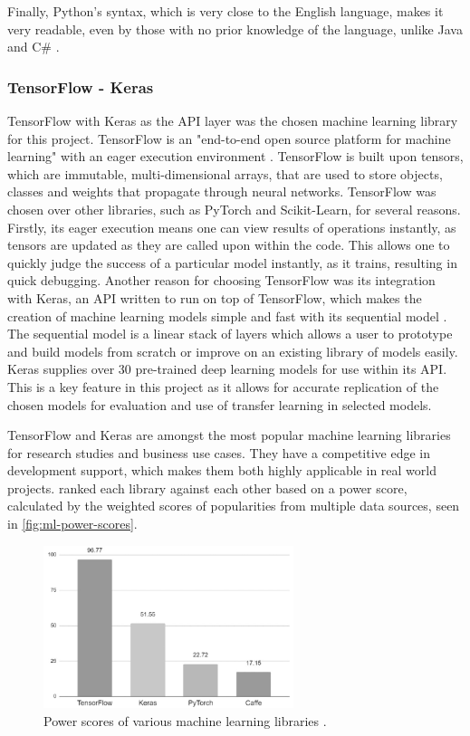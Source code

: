 Finally, Python’s syntax, which is very close to the English language, makes it very readable, even by those with no prior knowledge of the language, unlike Java and C\# \citep{srinath2017python}.

\subsubsection{TensorFlow - Keras}
TensorFlow with Keras as the API layer was the chosen machine learning library for this project. TensorFlow is an "end-to-end open source platform for machine learning" with an eager execution environment \citep{TensorFl5:online}. TensorFlow is built upon tensors, which are immutable, multi-dimensional arrays, that are used to store objects, classes and weights that propagate through neural networks. TensorFlow was chosen over other libraries, such as PyTorch and Scikit-Learn, for several reasons.  Firstly, its eager execution means one can view results of operations instantly, as tensors are updated as they are called upon within the code. This allows one to quickly judge the success of a particular model instantly, as it trains, resulting in quick debugging. Another reason for choosing TensorFlow was its integration with Keras, an API written to run on top of TensorFlow, which makes the creation of machine learning models simple and fast with its sequential model \citep{AboutKer65:online}. The sequential model is a linear stack of layers which allows a user to prototype and build models from scratch or improve on an existing library of models easily. Keras supplies over 30 pre-trained deep learning models for use within its API. This is a key feature in this project as it allows for accurate replication of the chosen models for evaluation and use of transfer learning in selected models.

TensorFlow and Keras are amongst the most popular machine learning libraries for research studies and business use cases. They have a competitive edge in development support, which makes them both highly applicable in real world projects. \cite{hale2018deep} ranked each library against each other based on a power score, calculated by the weighted scores of popularities from multiple data sources, seen in \autoref{fig:ml-power-scores}. 

\begin{figure}[H]
    \centering
    \includegraphics[width=0.65\textwidth]{figures/ml-power-sources.jpg}
    \caption{Power scores of various machine learning libraries \citep{hale2018deep}.}
    \label{fig:ml-power-scores}
\end{figure}

